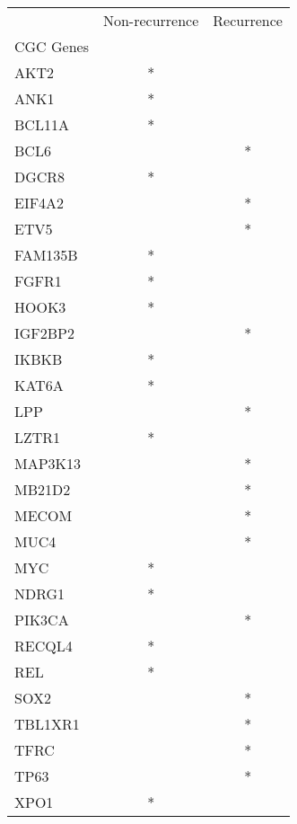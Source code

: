 \begin{tabular}{lcc}
\toprule
{} & Non-recurrence & Recurrence \\
CGC Genes &                &            \\
\midrule
AKT2      &              * &            \\
ANK1      &              * &            \\
BCL11A    &              * &            \\
BCL6      &                &          * \\
DGCR8     &              * &            \\
EIF4A2    &                &          * \\
ETV5      &                &          * \\
FAM135B   &              * &            \\
FGFR1     &              * &            \\
HOOK3     &              * &            \\
IGF2BP2   &                &          * \\
IKBKB     &              * &            \\
KAT6A     &              * &            \\
LPP       &                &          * \\
LZTR1     &              * &            \\
MAP3K13   &                &          * \\
MB21D2    &                &          * \\
MECOM     &                &          * \\
MUC4      &                &          * \\
MYC       &              * &            \\
NDRG1     &              * &            \\
PIK3CA    &                &          * \\
RECQL4    &              * &            \\
REL       &              * &            \\
SOX2      &                &          * \\
TBL1XR1   &                &          * \\
TFRC      &                &          * \\
TP63      &                &          * \\
XPO1      &              * &            \\
\bottomrule
\end{tabular}
